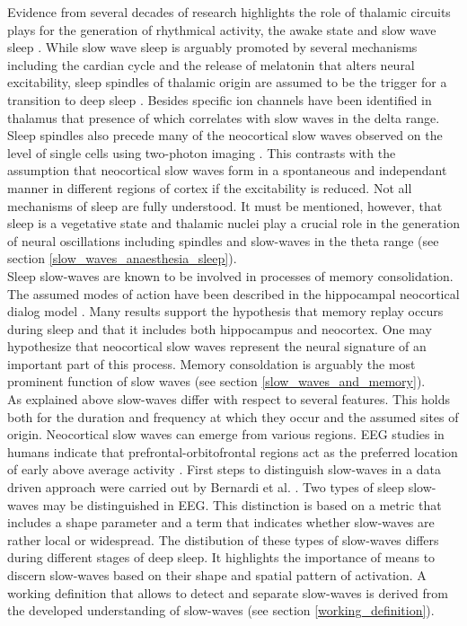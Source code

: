 Evidence from several decades of research highlights the role of thalamic circuits plays for the generation of rhythmical activity, the awake state and slow wave sleep \parencite{brown2012control}. While slow wave sleep is arguably promoted by several mechanisms including the cardian cycle and the release of melatonin that alters neural excitability, sleep spindles of thalamic origin are assumed to be the trigger for a transition to deep sleep \parencite[p. 347]{montagna2005fatal}. Besides specific ion channels have been identified in thalamus that presence of which correlates with slow waves in the delta range\parencite[p. 1112]{brown2012control}. Sleep spindles also precede many of the neocortical slow waves observed on the level of single cells using two-photon imaging \parencite{niethard2018cortical}. This contrasts with the assumption that neocortical slow waves form in a spontaneous and independant manner in different regions of cortex if the excitability is reduced. Not all mechanisms of sleep are fully understood. It must be mentioned, however, that sleep is a vegetative state and thalamic nuclei play a crucial role in the generation of neural oscillations including spindles and slow-waves in the theta range (see section \ref{slow_waves_anaesthesia_sleep}).\\
Sleep slow-waves are known to be involved in processes of memory consolidation. The assumed modes of action have been described in the hippocampal neocortical dialog model \parencite{buzsaki1996hippocampo}. Many results support the hypothesis that memory replay occurs during sleep and that it includes both hippocampus and neocortex. One may hypothesize that neocortical slow waves represent the neural signature of an important part of this process. Memory consoldation is arguably the most prominent function of slow waves (see section \ref{slow_waves_and_memory}).\\
As explained above slow-waves differ with respect to several features. This holds both for the duration and frequency at which they occur and the assumed sites of origin. Neocortical slow waves can emerge from various regions. EEG studies in humans indicate that prefrontal-orbitofrontal regions act as the preferred location of early above average activity \parencite[p. 1110]{brown2012control}. First steps to distinguish slow-waves in a data driven approach were carried out by Bernardi et al. \parencite*{bernardi2018local}. Two types of sleep slow-waves may be distinguished in EEG. This distinction is based on a metric that includes a shape parameter and a term that indicates whether slow-waves are rather local or widespread. The distibution of these types of slow-waves differs during different stages of deep sleep. It highlights the importance of means to discern slow-waves based on their shape and spatial pattern of activation. A working definition that allows to detect and separate slow-waves is derived from the developed understanding of slow-waves (see section \ref{working_definition}).

